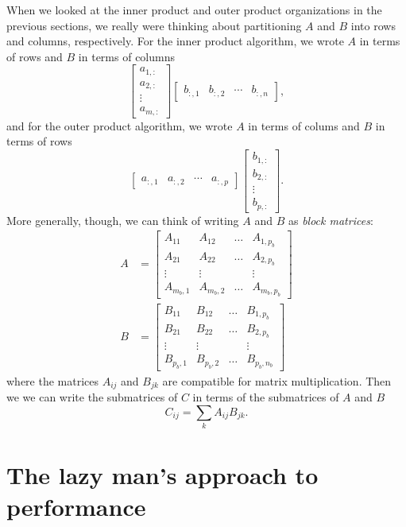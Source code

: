 \documentclass[12pt, leqno]{article}
\begin{document}
When we looked at the inner product and outer product organizations
in the previous sections, we really were thinking about partitioning
$A$ and $B$ into rows and columns, respectively.  For the inner product
algorithm, we wrote $A$ in terms of rows and $B$ in terms of columns
\[
  \begin{bmatrix} a_{1,:} \\ a_{2,:} \\ \vdots \\ a_{m,:} \end{bmatrix}
  \begin{bmatrix} b_{:,1} & b_{:,2} & \cdots & b_{:,n} \end{bmatrix},
\]
and for the outer product algorithm, we wrote $A$ in terms of colums
and $B$ in terms of rows
\[
  \begin{bmatrix} a_{:,1} & a_{:,2} & \cdots & a_{:,p} \end{bmatrix}
  \begin{bmatrix} b_{1,:} \\ b_{2,:} \\ \vdots \\ b_{p,:} \end{bmatrix}.
\]
More generally, though, we can think of writing $A$ and $B$ as 
{\em block matrices}: 
\begin{align*}
  A &=
  \begin{bmatrix}
    A_{11} & A_{12} & \ldots & A_{1,p_b} \\
    A_{21} & A_{22} & \ldots & A_{2,p_b} \\
    \vdots & \vdots &       & \vdots \\
    A_{m_b,1} & A_{m_b,2} & \ldots & A_{m_b,p_b}
  \end{bmatrix} \\
  B &=
  \begin{bmatrix}
    B_{11} & B_{12} & \ldots & B_{1,p_b} \\
    B_{21} & B_{22} & \ldots & B_{2,p_b} \\
    \vdots & \vdots &       & \vdots \\
    B_{p_b,1} & B_{p_b,2} & \ldots & B_{p_b,n_b}
  \end{bmatrix} 
\end{align*}
where the matrices $A_{ij}$ and $B_{jk}$ are compatible for matrix
multiplication.  Then we we can write the submatrices of $C$ in terms
of the submatrices of $A$ and $B$
\[
  C_{ij} = \sum_k A_{ij} B_{jk}.
\]

\section*{The lazy man's approach to performance}
\end{document}
